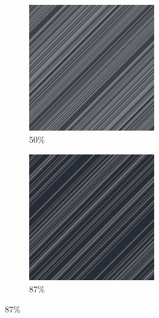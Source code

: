 \documentclass[12pt, fleqn]{report}                             %
\theoremstyle{break}                                            %
\begin{document}
\begin{figure}[ht!]
\begin{subfigure}[b]{0.4\linewidth}
          \includegraphics[width=0.6\textwidth]{Images/34/c.png}
          \caption{50\%}
        \end{subfigure}
        \begin{subfigure}[b]{0.4\linewidth}
          \includegraphics[width=0.6\textwidth]{Images/34/d.png}
          \caption{87\%}
        \end{subfigure}
      \end{figure}
\end{document}
